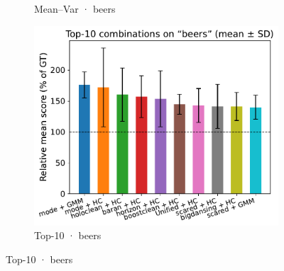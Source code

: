 \documentclass[10pt]{article} %
\numberwithin{equation}{section}
\begin{document}
\begin{figure}[htbp]
\begin{subfigure}{0.32\linewidth}
    \caption{Mean–Var · beers}
  \end{subfigure}\hfill
  \begin{subfigure}{0.34\linewidth}
    \centering
    \includegraphics[width=\linewidth]{figures/5.3.1graph/top10_bar_error_beers.pdf}
    \caption{Top-10 · beers}
  \end{subfigure}


\end{figure}
\end{document}
